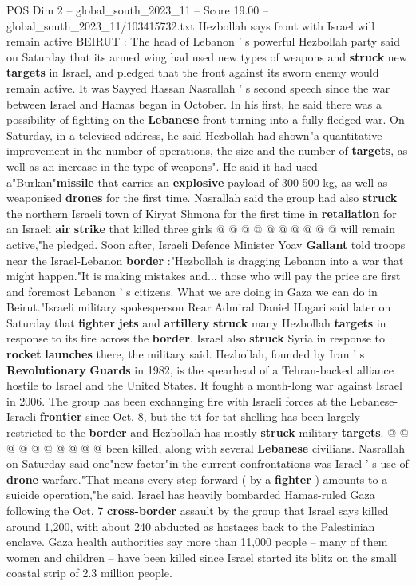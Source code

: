 \begin{textsample}{POS Dim 2 – global\_south\_2023\_11 – Score 19.00 – global\_south\_2023\_11/103415732.txt}  \label{ex:f2_pos_219}
Hezbollah says front with Israel will remain active BEIRUT : The head of Lebanon ' s powerful Hezbollah party said on Saturday that its armed wing had used new types of weapons and \textbf{struck} new \textbf{targets} in Israel, and pledged that the front against its sworn enemy would remain active.
It was Sayyed Hassan Nasrallah ' s second speech since the war between Israel and Hamas began in October.
In his first, he said there was a possibility of fighting on the \textbf{Lebanese} front turning into a fully-fledged war.
On Saturday, in a televised address, he said Hezbollah had shown"a quantitative improvement in the number of operations, the size and the number of \textbf{targets}, as well as an increase in the type of weapons".
He said it had used a"Burkan"\textbf{missile} that carries an \textbf{explosive} payload of 300-500 kg, as well as weaponised \textbf{drones} for the first time.
Nasrallah said the group had also \textbf{struck} the northern Israeli town of Kiryat Shmona for the first time in \textbf{retaliation} for an Israeli \textbf{air} \textbf{strike} that killed three girls @ @ @ @ @ @ @ @ @ @ will remain active,"he pledged.
Soon after, Israeli Defence Minister Yoav \textbf{Gallant} told troops near the Israel-Lebanon \textbf{border} :"Hezbollah is dragging Lebanon into a war that might happen."It is making mistakes and... those who will pay the price are first and foremost Lebanon ' s citizens.
What we are doing in Gaza we can do in Beirut."Israeli military spokesperson Rear Admiral Daniel Hagari said later on Saturday that \textbf{fighter} \textbf{jets} and \textbf{artillery} \textbf{struck} many Hezbollah \textbf{targets} in response to its fire across the \textbf{border}.
Israel also \textbf{struck} Syria in response to \textbf{rocket} \textbf{launches} there, the military said.
Hezbollah, founded by Iran ' s \textbf{Revolutionary} \textbf{Guards} in 1982, is the spearhead of a Tehran-backed alliance hostile to Israel and the United States.
It fought a month-long war against Israel in 2006.
The group has been exchanging fire with Israeli forces at the Lebanese-Israeli \textbf{frontier} since Oct. 8, but the tit-for-tat shelling has been largely restricted to the \textbf{border} and Hezbollah has mostly \textbf{struck} military \textbf{targets}. @ @ @ @ @ @ @ @ @ @ been killed, along with several \textbf{Lebanese} civilians.
Nasrallah on Saturday said one"new factor"in the current confrontations was Israel ' s use of \textbf{drone} warfare."That means every step forward ( by a \textbf{fighter} ) amounts to a suicide operation,"he said.
Israel has heavily bombarded Hamas-ruled Gaza following the Oct. 7 \textbf{cross-border} assault by the group that Israel says killed around 1,200, with about 240 abducted as hostages back to the Palestinian enclave.
Gaza health authorities say more than 11,000 people -- many of them women and children -- have been killed since Israel started its blitz on the small coastal strip of 2.3 million people.

\end{textsample}
